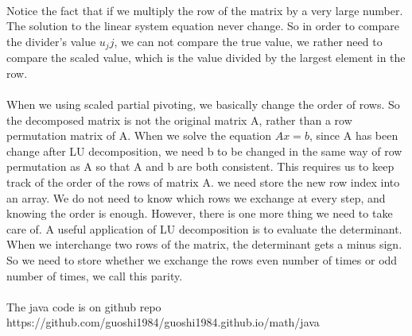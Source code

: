 \documentclass[a4paper]{article}
\begin{document}
\\
Notice the fact that if we multiply the row of the matrix by a very large number. The solution to the linear system equation never change. So in order to compare the divider's value $u_jj$, we can not compare the true value, we rather need to compare the scaled value, which is the value divided by the largest element in the row.\\

\\
When we using scaled partial pivoting, we basically change the order of rows. So the decomposed matrix is not the original matrix A, rather than a row permutation matrix of A. When we solve the equation $Ax=b$, since A has been change after LU decomposition, we need b to be changed in the same way of row permutation as A so that A and b are both consistent. This requires us to keep track of the order of the rows of matrix A. we need store the new row index into an array. We do not need to know which rows we exchange at every step, and knowing the order is enough. However, there is one more thing we need to take care of. A useful application of LU decomposition is to evaluate the determinant. When we interchange two rows of the matrix, the determinant gets a minus sign. So we need to store whether we exchange the rows even number of times or odd number of times, we call this parity.\\

\\
The java code is on github repo\\ 
https://github.com/guoshi1984/guoshi1984.github.io/math/java\\
\end{document}
